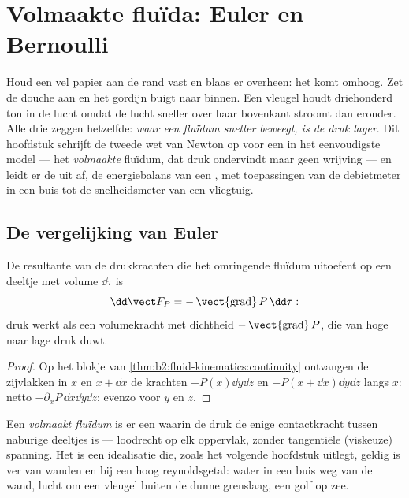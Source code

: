 \chapter{Volmaakte fluïda: Euler en Bernoulli}\label{ch:b2:euler-bernoulli}

Houd een vel papier aan de rand vast en blaas er overheen: het komt omhoog.
Zet de douche aan en het gordijn buigt naar binnen. Een vleugel houdt
driehonderd ton in de lucht omdat de lucht sneller over haar bovenkant
stroomt dan eronder. Alle drie zeggen hetzelfde: \emph{waar een fluïdum
sneller beweegt, is de druk lager}. Dit hoofdstuk schrijft de tweede wet van
Newton op voor een  in het eenvoudigste model --- het
\emph{volmaakte} fluïdum, dat druk ondervindt maar geen wrijving --- en
leidt er de  uit af, de energiebalans van een
, met toepassingen van de debietmeter in een buis tot de
snelheidsmeter van een vliegtuig.

\section{De vergelijking van Euler}

\begin{proposition}\label{prop:b2:euler-bernoulli:pressure}
De resultante van de drukkrachten die het omringende fluïdum uitoefent op
een deeltje met volume $\dd\tau$ is
\[
\dd\vect F_P = -\operatorname{\vect{grad}}P\,\dd\tau :
\]
druk werkt als een volumekracht met dichtheid
$-\operatorname{\vect{grad}}P$, die van hoge naar lage druk duwt.
\end{proposition}

\begin{proof}
Op het blokje van \cref{thm:b2:fluid-kinematics:continuity} ontvangen de
zijvlakken in $x$ en $x + \dd x$ de krachten $+P(x)\dd y\dd z$ en
$-P(x + \dd x)\dd y\dd z$ langs $x$: netto $-\partial_xP\,\dd x\dd y\dd z$; evenzo
voor $y$ en $z$.
\end{proof}

\begin{definition}\label{def:b2:euler-bernoulli:perfect}
Een \emph{volmaakt fluïdum} is er een waarin de druk de enige contactkracht
tussen naburige deeltjes is --- loodrecht op elk oppervlak, zonder
tangentiële (viskeuze) spanning. Het is een idealisatie die, zoals het
volgende hoofdstuk uitlegt, geldig is ver van wanden en bij een hoog
reynoldsgetal: water in een buis weg van de wand, lucht om een vleugel
buiten de dunne grenslaag, een golf op zee.
\end{definition}


